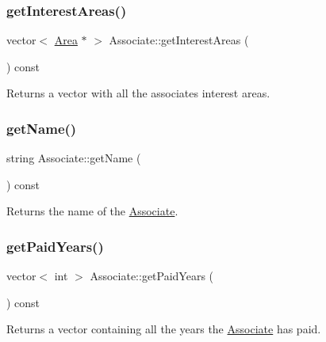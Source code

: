 \mbox{\label{classAssociate_ac53645c77c48f2439dc3a5f8eb9ef530}} 
\subsubsection{\texorpdfstring{get\+Interest\+Areas()}{getInterestAreas()}}
{\footnotesize\ttfamily vector$<$ \mbox{\hyperlink{classArea}{Area}} $\ast$ $>$ Associate\+::get\+Interest\+Areas (\begin{DoxyParamCaption}{ }\end{DoxyParamCaption}) const}



Returns a vector with all the associate\textquotesingle{}s interest areas. 

\mbox{\label{classAssociate_a85601dd07022fc20f76f9f761fdcec6a}} 
\subsubsection{\texorpdfstring{get\+Name()}{getName()}}
{\footnotesize\ttfamily string Associate\+::get\+Name (\begin{DoxyParamCaption}{ }\end{DoxyParamCaption}) const}



Returns the name of the \mbox{\hyperlink{classAssociate}{Associate}}. 

\mbox{\label{classAssociate_ab3837d6afb9cba8e9f3213ca9b8368b9}} 
\subsubsection{\texorpdfstring{get\+Paid\+Years()}{getPaidYears()}}
{\footnotesize\ttfamily vector$<$ int $>$ Associate\+::get\+Paid\+Years (\begin{DoxyParamCaption}{ }\end{DoxyParamCaption}) const}



Returns a vector containing all the years the \mbox{\hyperlink{classAssociate}{Associate}} has paid. 

